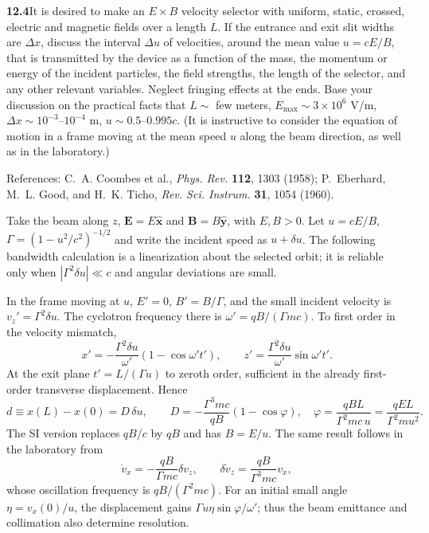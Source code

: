 \par\bigskip
\noindent\textbf{12.4}\quad It is desired to make an $E\times B$ velocity selector with uniform, static, crossed, electric and magnetic fields over a length $L$. If the entrance and exit slit widths are $\Delta x$, discuss the interval $\Delta u$ of velocities, around the mean value $u=cE/B$, that is transmitted by the device as a function of the mass, the momentum or energy of the incident particles, the field strengths, the length of the selector, and any other relevant variables. Neglect fringing effects at the ends. Base your discussion on the practical facts that $L\sim$ few meters, $E_{\max}\sim3\times10^{6}$ V/m, $\Delta x\sim10^{-3}$--$10^{-4}$ m, $u\sim0.5$--$0.995c$. (It is instructive to consider the equation of motion in a frame moving at the mean speed $u$ along the beam direction, as well as in the laboratory.)

References: C.~A. Coombes et al., \emph{Phys. Rev.} \textbf{112}, 1303 (1958); P.~Eberhard, M.~L. Good, and H.~K. Ticho, \emph{Rev. Sci. Instrum.} \textbf{31}, 1054 (1960).
\solution

Take the beam along $z$, $\mathbf E=E\widehat{\mathbf x}$ and
$\mathbf B=B\widehat{\mathbf y}$, with $E,B>0$.
Let $u=cE/B$, $\Gamma=(1-u^2/c^2)^{-1/2}$ and write the incident
speed as $u+\delta u$.  The following bandwidth calculation is a
linearization about the selected orbit; it is reliable only when
$|\Gamma^2\delta u|\ll c$ and angular deviations are small.

In the frame moving at $u$, $E'=0$, $B'=B/\Gamma$, and the small
incident velocity is $v_z'=\Gamma^2\delta u$.
The cyclotron frequency there is
$\omega'=qB/(\Gamma mc)$.  To first order in the velocity mismatch,
\[
x'=-\frac{\Gamma^2\delta u}{\omega'}(1-\cos\omega't'),
\qquad z'=\frac{\Gamma^2\delta u}{\omega'}\sin\omega't'.
\]
At the exit plane $t'=L/(\Gamma u)$ to zeroth order, sufficient
in the already first-order transverse displacement.  Hence
\[
\boxed{d\equiv x(L)-x(0)=D\,\delta u,\qquad
D=-\frac{\Gamma^3mc}{qB}(1-\cos\varphi),\quad
\varphi=\frac{qBL}{\Gamma^2mc\,u}
 =\frac{qEL}{\Gamma^2mu^2}.}
\]
The SI version replaces $qB/c$ by $qB$ and has $B=E/u$.
The same result follows in the laboratory from
\[
\dot v_x=-\frac{qB}{\Gamma mc}\delta v_z,
\qquad \delta\dot v_z=\frac{qB}{\Gamma^3mc}v_x,
\]
whose oscillation frequency is $qB/(\Gamma^2mc)$.
For an initial small angle $\eta=v_x(0)/u$, the displacement gains
$\Gamma u\eta\sin\varphi/\omega'$; thus the beam emittance and
collimation also determine resolution.

